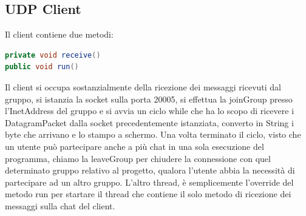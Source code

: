 \documentclass[]{article}
\begin{document}
\subsection{UDP Client}
Il client contiene due metodi:
\begin{lstlisting}[language=java]
private void receive()
public void run()
\end{lstlisting}
Il client si occupa sostanzialmente della ricezione dei messaggi ricevuti dal gruppo, si istanzia la socket sulla porta 20005, si effettua la joinGroup presso l'InetAddress del gruppo e si avvia un ciclo while che ha lo scopo di ricevere i DatagramPacket dalla socket precedentemente istanziata, converto in String i byte che arrivano e lo stampo a schermo.
Una volta terminato il ciclo, visto che un utente può partecipare anche a più chat in una sola esecuzione del programma, chiamo la leaveGroup per chiudere la connessione con quel determinato gruppo relativo al progetto, qualora l'utente abbia la necessità di partecipare ad un altro gruppo.
L'altro thread, è semplicemente l'override del metodo run per startare il thread che contiene il solo metodo di ricezione dei messaggi sulla chat del client.
\end{document}
